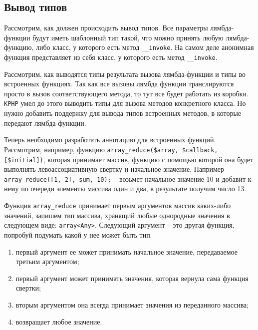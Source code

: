 \subsection{Вывод типов}
Рассмотрим, как должен происходить вывод типов.
Все параметры лямбда-функции будут иметь шаблонный тип такой, что можно принять любую лямбда-функцию, либо класс, у которого есть метод \verb|__invoke|.
На самом деле анонимная функция представляет из себя класс, у которого есть метод \verb|__invoke|.

Рассмотрим, как выводятся типы результата вызова лямбда-функции и типы во встроенных функциях.
Так как все вызовы лямбда функции транслируются просто в вызов соответствующего метода, то тут все будет работать из коробки.
\verb|KPHP| умел до этого выводить типы для вызова методов конкретного класса.
Но нужно добавить поддержку для вывода типов встроенных методов, в которые передают лямбда-функции.

Теперь необходимо разработать аннотацию для встроенных функций.
Рассмотрим, например, функцию \verb|array_reduce($array, $callback, [$initial])|, которая принимает массив, функцию с помощью которой она будет выполнять левоассоциативную свертку \cite{foldl} и начальное значение.
Например \verb|array_reduce([1, 2], sum, 10);| -- возьмет начальное значение 10 и добавит к нему по очереди элементы массива один и два, в результате получим число 13.

Функция \verb|array_reduce| принимает первым аргументов массив каких-либо значений, запишем тип массива, хранящий любые однородные значения в следующем виде: \verb|array<Any>|.
Следующий аргумент -- это другая функция, попробуй подумать какой у нее может быть тип:
\begin{enumerate}
  \item первый аргумент ее может принимать начальное значение, передаваемое третьим аргументом;
  \item первый аргумент может принимать значения, которая вернула сама функция свертки;
  \item вторым аргументом она всегда принимает значения из переданного массива;
  \item возвращает любое значение.
\end{enumerate}

